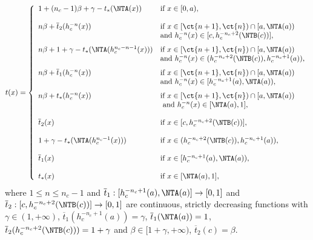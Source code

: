 \begin{theorem}
\begin{enumerate}[label=(\roman*)]
		\begin{equation}\label{eq:GeneratorCompletion(a,1)c-5}
			t(x)
			=
			\left\{ \begin{array}{ll}
				1 + (n_c-1)\beta + \gamma -t_*(\NTA(x)) & \text{if } x \in [0,a), \\
				& \\
				n\beta + \overline{t}_2(h_c^{-n}(x)) & \text{if } x \in [\ct{n+1},\ct{n}) \cap [a,\NTA(a))\\
				& \text{and } h_c^{-n}(x) \in [c,h_c^{-n_c+2}(\NTB(c))], \\[7pt]
				n\beta + 1 + \gamma - t_*(\NTA(h_c^{n_c-n-1}(x))) & \text{if } x \in [\ct{n+1},\ct{n}) \cap [a,\NTA(a))\\
				& \text{and } h_c^{-n}(x) \in (h_c^{-n_c+2}(\NTB(c)),h_c^{-n_c+1}(a)), \\[7pt]
				n\beta + \overline{t}_1(h_c^{-n}(x)) & \text{if } x \in [\ct{n+1},\ct{n}) \cap [a,\NTA(a))\\
				& \text{and } h_c^{-n}(x) \in [h_c^{-n_c+1}(a),\NTA(a)), \\[7pt]
				n\beta + t_*(h_c^{-n}(x)) & \text{if } x \in [\ct{n+1},\ct{n}) \cap [a,\NTA(a)) \\
				& \text{ and } h_c^{-n}(x) \in [\NTA(a),1], \\
				& \\
				\overline{t}_2(x) & \text{if } x \in [c,h_c^{-n_c+2}(\NTB(c))], \\
				& \\
				1 + \gamma - t_*(\NTA(h_c^{n_c-1}(x))) & \text{if } x \in (h_c^{-n_c+2}(\NTB(c)),h_c^{-n_c+1}(a)), \\
				& \\
				\overline{t}_1(x) & \text{if } x \in [h_c^{-n_c+1}(a),\NTA(a)), \\
				& \\
				t_{*}(x) & \text{if } x \in [\NTA(a),1],
			\end{array} \right.
		\end{equation}		
		where $1\leq n \leq n_c-1$ and $\overline{t}_1:[h_c^{-n_c+1}(a),\NTA(a)] \to [0,1]$ and \linebreak $\overline{t}_2:[c,h_c^{-n_c+2}(\NTB(c))] \to [0,1]$ are continuous, strictly decreasing functions with $\gamma \in (1,+\infty)$, $\overline{t}_1(h_c^{-n_c+1}(a)) = \gamma$, $\overline{t}_1(\NTA(a))=1$, $\overline{t}_2(h_c^{-n_c+2}(\NTB(c))) = 1 + \gamma$ and $\beta \in [1+\gamma,+\infty)$, $\overline{t}_2(c)= \beta$.
	\end{enumerate}
\end{theorem}
